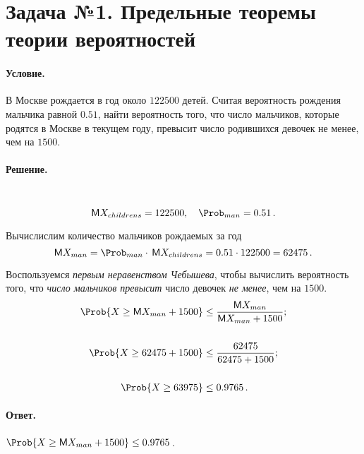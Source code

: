 
\section{Задача №1. Предельные теоремы теории вероятностей}

\paragraph{Условие.} В Москве рождается в год около $122500$ детей. Считая вероятность рождения мальчика равной $0.51$, найти вероятность того, что число мальчиков, которые родятся в Москве в текущем году, превысит число родившихся девочек не менее, чем на $1500$.

\paragraph{Решение.}\hfill\\
\[
    \Expect X_{childrens} = 122500, \quad \Prob_{man} = 0.51\,.
\]

\noindent
Вычислислим количество мальчиков рождаемых за год
\[
    \Expect X_{man} = \Prob_{man} \cdot\, \Expect X_{childrens} = 0.51 \cdot 122500 = 62475\,.
\]

\noindent
Воспользуемся \emph{первым неравенством Чебышева}, чтобы вычислить вероятность того, что \emph{число мальчиков превысит} число девочек \emph{не менее}, чем на $1500$.
\begin{align*}
    \Prob \{ X \geq \Expect X_{man} + 1500 \} &\leq \frac{\Expect X_{man}}{\Expect X_{man} + 1500};
    \\\\
    \Prob \{ X \geq 62475 + 1500 \} &\leq \frac{62475}{62475 + 1500};
    \\\\
    \Prob \{ X \geq 63975 \} &\leq 0.9765\,.
\end{align*}

\paragraph{Ответ.} $\Prob \{ X \geq \Expect X_{man} + 1500 \} \leq 0.9765$\,.